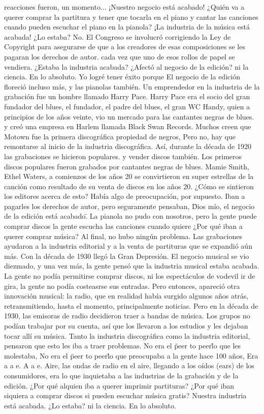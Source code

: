 \documentclass[10pt]{book}
\begin{document}
reacciones fueron,  un momento... ¡Nuestro negocio está acabado! ¿Quién va a querer comprar la partitura y tener que tocarla en el piano y cantar las canciones cuando pueden escuchar el piano  en la pianola? ¡La industria de la música está acabada! ¿Lo estaba? No. El Congreso se involucró corrigiendo la Ley de Copyright para asegurarse de que a los creadores de esas composiciones se les pagaran los derechos de autor. cada vez que uno de esos rollos de papel se vendiera. ¿Estaba la industria acabada? ¿Afectó al negocio de la edición? ni la ciencia. En lo absoluto. Yo logré tener éxito porque El negocio de la edición floreció incluso más, y las pianolas también. Un emprendedor en la industria de la grabación fue un hombre llamado Harry Pace. Harry Pace era el socio del gran fundador del blues, el fundador, el padre del blues, el gran WC Handy, quien a principios de los años veinte,  vio un mercado para las cantantes negras de blues. y creó una empresa en Harlem llamada Black Swan Records. Muchos creen que Motown fue la primera discográfica propiedad de negros, Pero no, hay que remontarse al inicio de la industria discográfica. Así, durante la década de 1920 las grabaciones se hicieron populares. y vender discos también. Los primeros discos populares fueron grabados por cantantes negras de blues. Mamie Smith, Ethel Waters, a comienzos de los años 20 se convirtieron en super estrellas de la canción como resultado de  su venta de discos en los años 20. ¿Cómo se sintieron los editores acerca de esto? Había algo de preocupación, por supuesto. Iban a pagarles los derechos de autor, pero seguramente pensaban, \" Dios mío, el negocio de la edición está acabado\" . La pianola no pudo con nosotros, pero la gente puede comprar discos la gente escucha las canciones cuando quiere ¿Por qué iban a querer comprar música? Al final, no hubo ningún problema. Las grabaciones ayudaron  a la industria editorial y a la venta de partituras que se expandió aún más. Con la década de 1930 llegó la Gran Depresión. El negocio musical se vio diezmado, y una vez más, la gente pensó que  la industria musical estaba acabada. La gente no podía permitirse comprar discos, ni los espectáculos de vodevil ir de gira, la gente no podía costeasrse sus entradas. Pero entonces, apareció otra innovación musical: la radio, que en realidad había surgido algunos años atrás, retransmitiendo, hasta el momento, principalmente noticias. Pero en la década de 1930, las emisoras de radio  decidieron traer a bandas de música. Los grupos no podían trabajar por su cuenta, así que los llevaron a los estudios y les dejaban tocar allí su música. Tanto la industria discográfica como la industria editorial, pensaron que esto les iba a traer problemas. No era el \" peer to peer\" lo que les molestaba, No era el \" peer to peer\" lo que preocupaba a la gente hace 100 años, Era a a e. A a e. Aire, las ondas de radio en el aire,  llegando a los oídos (ears) de los consumidores, era lo que inquietaba a las industrias de la grabación y de la edición. ¿Por qué alquien iba a querer imprimir partituras? ¿Por qué iban siquiera a comprar discos si pueden escuchar música gratis? Nuestra industria está acabada. ¿Lo estaba? ni la ciencia. En lo absoluto.\\
\end{document}
